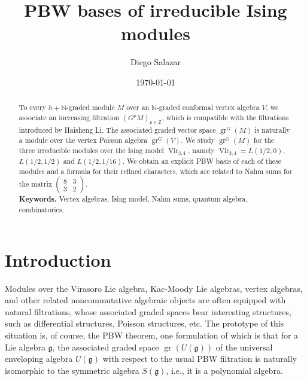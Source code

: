 \documentclass[a4paper, 12pt, reqno]{amsart}
\theoremstyle{remark}
\DeclareMathOperator{\Vir}{Vir}
\DeclareMathOperator{\gr}{gr}
\begin{document}
\setcounter{section}{-1}

\begin{abstract}
  To every $h + \mathbb{N}$-graded module $M$ over an $\mathbb{N}$-graded conformal vertex algebra $V$, we associate an increasing filtration $(G^pM)_{p \in \mathbb{Z}}$, which is compatible with the filtrations introduced by Haisheng Li.
  The associated graded vector space $\gr^G(M)$ is naturally a module over the vertex Poisson algebra $\gr^G(V)$.
  We study $\gr^G(M)$ for the three irreducible modules over the Ising model $\Vir_{3, 4}$, namely $\Vir_{3, 4} = L(1/2, 0)$, $L(1/2, 1/2)$ and $L(1/2, 1/16)$.
  We obtain an explicit PBW basis of each of these modules and a formula for their refined characters, which are related to Nahm sums for the matrix $\left(\begin{smallmatrix} 8 & 3 \\ 3 & 2 \end{smallmatrix}\right)$. \\
  \smallskip
  \noindent \textbf{Keywords.} Vertex algebras, Ising model, Nahm sums, quantum algebra, combinatorics.
\end{abstract}

\title{PBW bases of irreducible Ising modules}
\author{Diego Salazar}
\address{Instituto de Matemática Pura e Aplicada, Rio de Janeiro, RJ, Brazil}
\date{\today}
\maketitle

\vspace{-1em}
\tableofcontents

\section{Introduction}
\label{sec:introduction}

Modules over the Virasoro Lie algebra, Kac-Moody Lie algebras, vertex algebras, and other related noncommutative algebraic objects are often equipped with natural filtrations, whose associated graded spaces bear interesting structures, such as differential structures, Poisson structures, etc.
The prototype of this situation is, of course, the PBW theorem, one formulation of which is that for a Lie algebra $\mathfrak{g}$, the associated graded space $\gr(U(\mathfrak{g}))$ of the universal enveloping algebra $U(\mathfrak{g})$ with respect to the usual PBW filtration is naturally isomorphic to the symmetric algebra $S(\mathfrak{g})$, i.e., it is a polynomial algebra.
\end{document}
